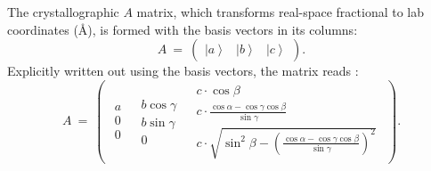 The crystallographic $A$ matrix, which transforms real-space fractional to lab coordinates (\AA), 
is formed with the basis vectors in its columns:
\begin{equation}
	A \ =\  \left(
		\begin{array}{ccc}
			\left| a \right> & \left| b \right> & \left| c \right>
		\end{array}
	\right).
\end{equation}
Explicitly written out using the basis vectors, the matrix reads \cite{wiki_fractional}:
\begin{equation}
	A \ =\  \left(
		\begin{array}{ccc}
			\begin{array}{c} a \\ 0 \\ 0 \end{array}
			& 
			\begin{array}{c} b \cos \gamma \\ b \sin \gamma \\ 0 \end{array} 
			& 
			\begin{array}{c}
				c \cdot \cos \beta \\
				c \cdot \frac{\cos \alpha - \cos \gamma \cos \beta}{\sin \gamma} \\
				c \cdot \sqrt{ \sin^2 \beta - \left(\frac{\cos \alpha - \cos \gamma \cos \beta}{\sin \gamma} \right)^2 }
			\end{array}
		\end{array}
	\right).
\end{equation}


